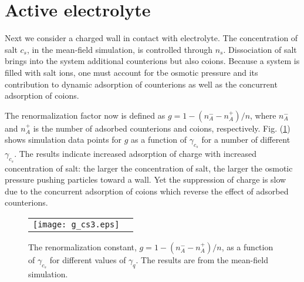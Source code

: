 \documentclass[pre,twocolumn,graphicx]{revtex4-1}
\begin{document}
\section{Active electrolyte}
\label{sec:electrolyte}

Next we consider a charged wall in contact with electrolyte.  
The concentration of salt $c_s$, in the mean-field simulation, is controlled through $n_s$. 
Dissociation of salt brings into the system additional counterions but also coions.  
Because a system is filled with salt ions, one must account for tbe osmotic pressure and its contribution
to dynamic adsorption of counterions as well as the concurrent adsorption of coions.  




The renormalization factor now is defined as $g = 1-(n_A^--n_A^+)/n$, 
where $n_A^-$ and $n_A^+$ is the number of adsorbed counterions and coions, respectively. 
Fig. (\ref{fig:g2}) shows simulation data points for $g$ as a function of $\gamma_{c_s}$ for a number of 
different $\gamma_{c_s}$.  
The results indicate increased adsorption of charge with increased concentration of salt: the larger 
the concentration of salt, the larger the osmotic pressure pushing particles toward a wall.  Yet the suppression 
of charge is slow due to the concurrent adsorption of coions which reverse the effect of adsorbed counterions.  
\graphicspath{{figures/}}
\begin{figure}[h] 
 \begin{center}
 \begin{tabular}{rr}
  \texttt{[image: g\_cs3.eps]}
 \end{tabular}
 \end{center}
\caption{The renormalization constant, $g=1-(n_A^--n_A^+)/n$, as a function of $\gamma_{c_s}$ for 
different values of $\gamma_q$.  The results are from the mean-field simulation.  } 
\label{fig:g2}
\end{figure}
\end{document}
